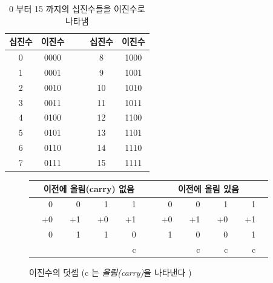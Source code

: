 \begin{table}[t]
\begin{center}
\begin{tabular}{||c|c||cc||c|c||}
\hline
십진수 & 이진수 & & & 십진수 & 이진수 \\
\hline
0       & 0000   & & & 8       & 1000 \\
\hline
1       & 0001   & & & 9       & 1001 \\
\hline
2       & 0010   & & & 10      & 1010 \\
\hline
3       & 0011   & & & 11      & 1011 \\
\hline
4       & 0100   & & & 12      & 1100 \\
\hline
5       & 0101   & & & 13      & 1101 \\
\hline
6       & 0110   & & & 14      & 1110 \\
\hline
7       & 0111   & & & 15      & 1111 \\
\hline
\end{tabular}
\caption{0 부터 15 까지의 십진수들을 이진수로 나타냄\label{tab:dec-bin}}
\end{center}
\end{table}


\begin{figure}[h]
\begin{center}
\begin{tabular}{|rrrrrrrrp{.1cm}|p{.1cm}rrrrrrrr|}
\hline
& \multicolumn{7}{c}{이전에 올림(carry) 없음} & & & \multicolumn{7}{c}{이전에 올림 있음} & \\
\hline
&  0 & &  0 & &  1 & &  1 & & &  0 & &  0 & &  1 & & 1  & \\
& +0 & & +1 & & +0 & & +1 & & & +0 & & +1 & & +0 & & +1 &  \\
\cline{2-2} \cline{4-4} \cline{6-6} \cline{8-8} \cline{11-11} \cline{13-13} \cline{15-15} \cline{17-17}
& 0  & & 1  & & 1  & & 0  & & & 1  & & 0  & & 0  & & 1 & \\
&    & &    & &    & & c  & & &    & & c  & & c  & & c & \\
\hline
\end{tabular}

\caption{이진수의 덧셈 (c 는 \emph{올림(carry)}을 나타낸다 )\label{fig:bin-add}}
\end{center}
\end{figure}

